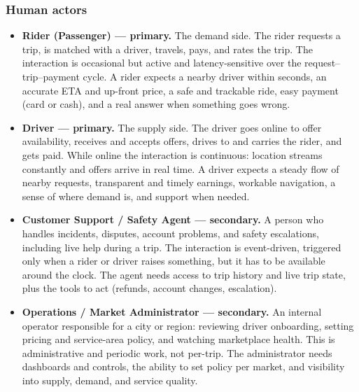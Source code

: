 \subsubsection*{Human actors}

\begin{itemize}[leftmargin=1.4em,itemsep=0.2em]
  \item \textbf{Rider (Passenger) --- primary.} The demand side. The rider
        requests a trip, is matched with a driver, travels, pays, and rates
        the trip. The interaction is occasional but active and
        latency-sensitive over the request--trip--payment cycle. A rider
        expects a nearby driver within seconds, an accurate ETA and up-front
        price, a safe and trackable ride, easy payment (card or cash), and a
        real answer when something goes wrong.

  \item \textbf{Driver --- primary.} The supply side. The driver goes online
        to offer availability, receives and accepts offers, drives to and
        carries the rider, and gets paid. While online the interaction is
        continuous: location streams constantly and offers arrive in real
        time. A driver expects a steady flow of nearby requests, transparent
        and timely earnings, workable navigation, a sense of where demand is,
        and support when needed.

  \item \textbf{Customer Support / Safety Agent --- secondary.} A person who
        handles incidents, disputes, account problems, and safety
        escalations, including live help during a trip. The interaction is
        event-driven, triggered only when a rider or driver raises something,
        but it has to be available around the clock. The agent needs access
        to trip history and live trip state, plus the tools to act (refunds,
        account changes, escalation).

  \item \textbf{Operations / Market Administrator --- secondary.} An internal
        operator responsible for a city or region: reviewing driver
        onboarding, setting pricing and service-area policy, and watching
        marketplace health. This is administrative and periodic work, not
        per-trip. The administrator needs dashboards and controls, the
        ability to set policy per market, and visibility into supply, demand,
        and service quality.
\end{itemize}

